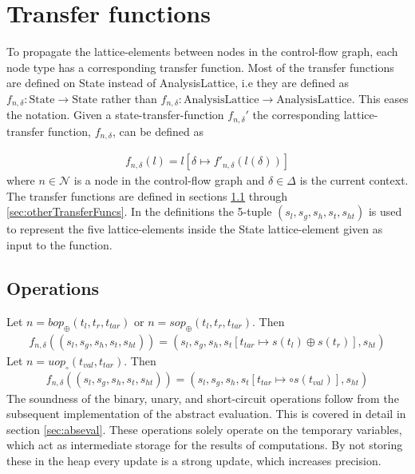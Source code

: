 \section{Transfer functions}
\label{sec:transferf}
\newcommand{\letin}[1]{\texttt{let } #1 \texttt{ in }}
\newcommand{\ifelse}[3]{\texttt{if }#1\texttt{ then } #2 \texttt{ else } #3}
\newcommand{\match}[1]{\texttt{match }#1}
\newcommand{\with}[1]{\texttt{with }#1\text{: }}
\newcommand{\coerce}[2]{c_{\text{#1}, \text{#2}}}
\newcommand{\default}{\texttt{default: }}
To propagate the lattice-elements between nodes in the control-flow graph, each node type has a corresponding transfer function. Most of the transfer functions are defined on State instead of {AnalysisLattice}, i.e they are defined as $f_{n,\delta} : \text{State} \rightarrow \text{State}$ rather than $f_{n,\delta} : \text{AnalysisLattice} \rightarrow \text{AnalysisLattice}$. This eases the notation. Given a state-transfer-function $f_{n,\delta}'$ the corresponding lattice-transfer function, $f_{n,\delta}$, can be defined as

\begin{align}
f_{n,\delta}(l) = l[\delta\mapsto f'_{n, \delta}(l(\delta))]
\end{align}
where $n\in\mathcal{N}$ is a node in the control-flow graph and $\delta\in \Delta$ is the current context. The transfer functions are defined in sections \ref{sec:operations} through \ref{sec:otherTransferFuncs}. In the definitions the 5-tuple $(s_l, s_g, s_h, s_t, s_{ht})$ is used to represent the five lattice-elements inside the State lattice-element given as input to the function.

\subsection{Operations}
\label{sec:operations}
Let $n = \mathit{bop}_\oplus(t_l,t_r,t_{tar})$ or $n =  \mathit{sop}_\oplus(t_l,t_r,t_{tar})$. Then 
\begin{align}
f_{n,\delta}((s_l, s_g, s_h, s_t, s_{ht})) = (s_l, s_g, s_h, s_t[t_{tar}\mapsto s(t_l)\oplus s(t_r)], s_{ht})
\end{align}
Let $n = uop_\circ(t_{val},t_{tar})$. Then
\begin{align}
f_{n,\delta}((s_l, s_g, s_h, s_t, s_{ht})) = (s_l, s_g, s_h, s_t[t_{tar}\mapsto \circ s(t_{val})], s_{ht})
\end{align}
The soundness of the binary, unary, and short-circuit operations follow from the subsequent implementation of the abstract evaluation. This is covered in detail in section \ref{sec:abseval}. These operations solely operate on the temporary variables, which act as intermediate storage for the results of computations. By not storing these in the heap every update is a strong update, which increases precision.

